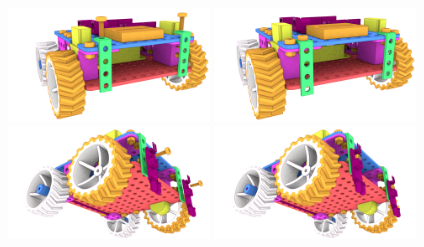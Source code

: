 \documentclass[twoside,a5paper,8pt]{article}
\begin{document}
  \includegraphics[height=30mm]{blender-render/render-instr/24-ir-mount1-dev.png}
  \includegraphics[height=30mm]{blender-render/render-instr/25-ir-mount1.png} \\
  \includegraphics[height=30mm]{blender-render/render-instr/26-ir-mount2-dev-view2.png}
  \includegraphics[height=30mm]{blender-render/render-instr/27-ir-mount2-view2.png} \\
\end{document}
